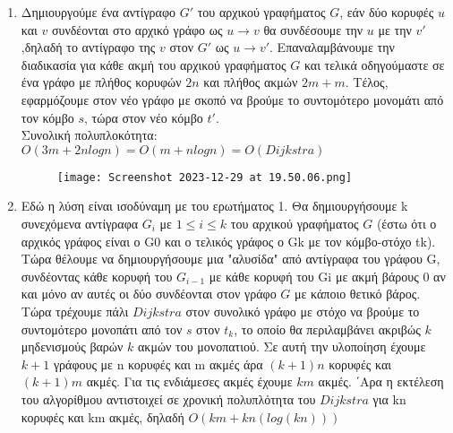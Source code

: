 \documentclass[11pt]{article}
\begin{document}
\begin{enumerate}
  \item Δημιουργούμε ένα αντίγραφο $G'$ του αρχικού γραφήματος $G$, εάν δύο κορυφές $u$ και $v$ συνδέονται στο αρχικό γράφο ως $u \rightarrow v$ θα συνδέσουμε την $u$ με την $v'$,δηλαδή το αντίγραφο της $v$ στον $G'$ ως $u \rightarrow v'$. Επαναλαμβάνουμε την διαδικασία για κάθε ακμή του αρχικού γραφήματος $G$ και τελικά οδηγούμαστε σε ένα γράφο με πλήθος κορυφών $2n$ και πλήθος ακμών $2m + m$. Τέλος, εφαρμόζουμε  στον νέο γράφο με σκοπό να βρούμε το συντομότερο μονομάτι από τον κόμβο $s$, τώρα στον νέο κόμβο $t'$. \\
  Συνολική πολυπλοκότητα: $O(3m + 2nlogn)= O(m + nlogn) = O(Dijkstra)$ \\
  \begin{figure}[h]
    \texttt{[image: Screenshot 2023-12-29 at 19.50.06.png]}
    \centering
  \end{figure}
  \item 
  Εδώ η λύση είναι ισοδύναμη με του ερωτήματος 1. Θα δημιουργήσουμε k συνεχόμενα αντίγραφα $G_i$ με $1 \leq i \leq k$ του αρχικού γραφήματος $G$ (έστω ότι ο αρχικός γράφος είναι ο G0 και ο τελικός γράφος ο Gk με τον κόμβο-στόχο tk). Τώρα θέλουμε να δημιουργήσουμε μια "αλυσίδα" από αντίγραφα του γράφου G, συνδέοντας κάθε κορυφή του $G_{i-1}$ με κάθε κορυφή του Gi με ακμή βάρους 0 αν και μόνο αν αυτές οι δύο συνδέονται στον γράφο $G$ με κάποιο θετικό βάρος. Τώρα τρέχουμε πάλι $Dijkstra$ στον συνολικό γράφο με στόχο να βρούμε το συντομότερο μονοπάτι από τον $s$ στον $t_k$, το οποίο θα περιλαμβάνει ακριβώς $k$
  μηδενισμούς βαρών $k$ ακμών του μονοπατιού.
  Σε αυτή την υλοποίηση έχουμε $k+1$ γράφους με n κορυφές και m ακμές άρα $(k+1)n$ κορυφές και $(k+1)m$ ακμές. Για τις ενδιάμεσες ακμές έχουμε $km$ ακμές. ΄Αρα η εκτέλεση
  του αλγορίθμου αντιστοιχεί σε χρονική πολυπλότητα του $Dijkstra$ για kn κορυφές και km
  ακμές, δηλαδή $O(km + kn(log(kn)))$
\end{enumerate}
\end{document}

